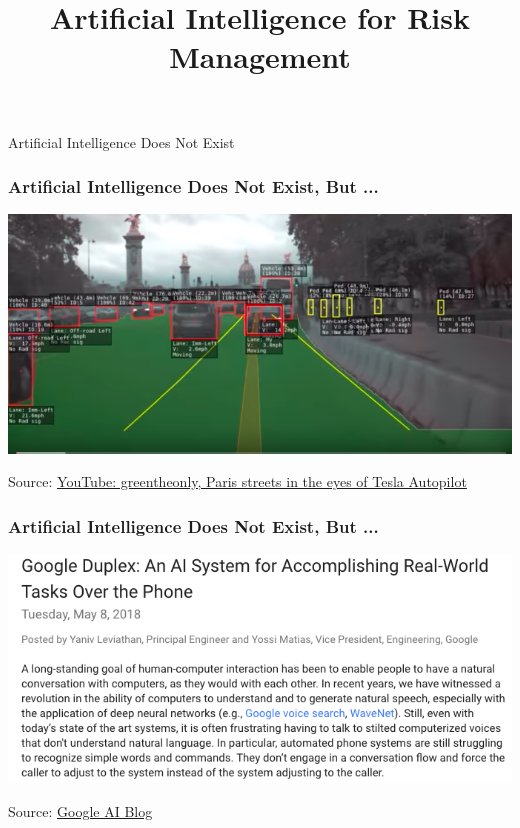 

\title{Artificial Intelligence for Risk Management}

\maketitle

\begin{frame}[c]
\begin{center}
\huge Artificial Intelligence Does Not Exist
\end{center}
\end{frame}

\begin{frame}
\frametitle{Artificial Intelligence Does Not Exist, But ...}
\includegraphics[width=\textwidth]{figures/tesla_paris}

Source: \href{https://www.youtube.com/watch?v=_1MHGUC_BzQs}{YouTube: greentheonly, Paris streets in the eyes of Tesla Autopilot}
\end{frame}

\begin{frame}
\frametitle{Artificial Intelligence Does Not Exist, But ...}
\includegraphics[width=\textwidth]{figures/google_duplex}

Source: \href{https://ai.googleblog.com/2018/05/duplex-ai-system-for-natural-conversation.html}{Google AI Blog}
\end{frame}

